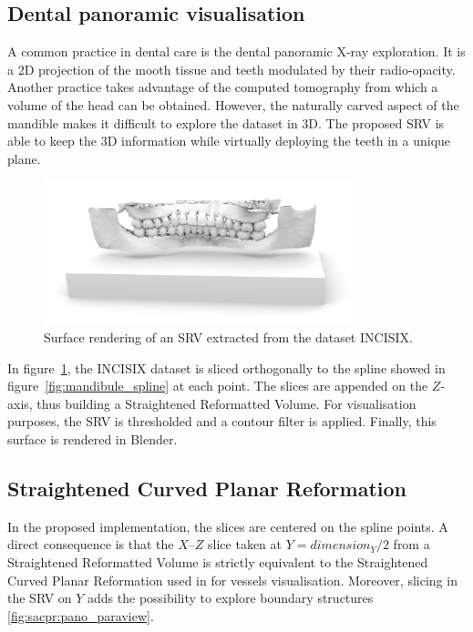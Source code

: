 \documentclass{InsightArticle}
\begin{document}
%
\subsection{Dental panoramic visualisation}
%
A common practice in dental care is the dental panoramic X-ray exploration. It
is a 2D projection of the mooth tissue and teeth modulated by their
radio-opacity. Another practice takes advantage of the computed tomography from
which a volume of the head can be obtained. However, the naturally carved aspect
of the mandible makes it difficult to explore the dataset in 3D. The proposed 
SRV is able to keep the 3D information while virtually deploying the teeth in a
unique plane.
%
\begin{figure}
\centering
\includegraphics[width=0.8\textwidth]{Images/pano_blender.png}
\caption{Surface rendering of an SRV extracted from the dataset INCISIX.}
\label{fig:pano_blender}
\end{figure}
%

In figure~\ref{fig:pano_blender}, the INCISIX dataset is sliced orthogonally to
the spline showed in figure~\ref{fig:mandibule_spline} at each point. The slices
are appended on the $Z$-axis, thus building a Straightened Reformatted Volume.
For visualisation purposes, the SRV is thresholded and a contour filter is
applied. Finally, this surface is rendered in Blender.
%
\subsection{Straightened Curved Planar Reformation}
%
In the proposed implementation, the slices are centered on the spline points. A
direct consequence is that the $X$--$Z$ slice taken at $Y=dimension_Y/2$ from a
Straightened Reformatted Volume is strictly equivalent to the Straightened
Curved Planar Reformation used in \cite{KAN02.1} for vessels visualisation.
Moreover, slicing in the SRV on $Y$ adds the possibility to explore boundary
structures \ref{fig:sacpr:pano_paraview}.
\end{document}
